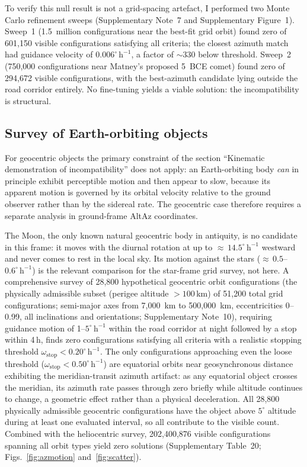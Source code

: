 \documentclass[sn-nature]{sn-jnl}
\begin{document}
To verify this null result is not a grid-spacing artefact, I performed two
Monte Carlo refinement sweeps (Supplementary Note~7
and Supplementary Figure~1). Sweep~1 (1.5~million configurations near the best-fit grid orbit)
found zero of 601,150 visible configurations satisfying all criteria; the
closest azimuth match had guidance velocity of $0.006^\circ\,\mathrm{h}^{-1}$, a
factor of ${\sim}330$ below threshold. Sweep~2 (750,000 configurations near
Matney's proposed 5~BCE comet) found zero of 294,672 visible configurations,
with the best-azimuth candidate lying outside the road corridor entirely. No
fine-tuning yields a viable solution: the incompatibility is structural.

\subsection{Survey of Earth-orbiting objects}\label{subsec:geocentric}

For geocentric objects the primary constraint of the section ``Kinematic demonstration of incompatibility''
does not apply: an Earth-orbiting body \emph{can} in principle exhibit
perceptible motion and then appear to slow, because its apparent motion is
governed by its orbital velocity relative to the ground observer rather than
by the sidereal rate. The geocentric case therefore requires a separate analysis
in ground-frame AltAz coordinates.

The Moon, the only known natural geocentric body in antiquity, is no
candidate in this frame: it moves with the diurnal rotation at up to
${\approx}\,14.5^\circ\,\mathrm{h}^{-1}$ westward and never comes to rest in
the local sky. Its motion against the stars (${\approx}\,0.5$--$0.6^\circ\,\mathrm{h}^{-1}$)
is the relevant comparison for the star-frame grid survey, not here.
A comprehensive survey of 28,800 hypothetical geocentric orbit configurations
(the physically admissible subset (perigee altitude $>100$\,km) of 51,200 total
grid configurations; semi-major axes from 7,000~km to 500,000~km,
eccentricities 0--0.99, all inclinations and orientations;
Supplementary Note~10), requiring guidance motion of
1--$5^\circ\,\mathrm{h}^{-1}$ within the road corridor at night followed by a stop
within 4\,h, finds zero configurations satisfying all criteria with a realistic
stopping threshold $\omega_\mathrm{stop} < 0.20^\circ\,\mathrm{h}^{-1}$.
The only configurations approaching even the loose threshold
($\omega_\mathrm{stop} < 0.50^\circ\,\mathrm{h}^{-1}$) are equatorial orbits
near geosynchronous distance exhibiting the meridian-transit azimuth artifact:
as any equatorial object crosses the meridian, its azimuth rate passes through
zero briefly while altitude continues to change, a geometric effect rather
than a physical deceleration.
All 28,800 physically admissible geocentric configurations have the object
above $5^\circ$ altitude during at least one evaluated interval, so all
contribute to the visible count.
Combined with the heliocentric survey, 202,400,876 visible configurations
spanning all orbit types yield zero solutions (Supplementary Table~20;
Figs.~\ref{fig:azmotion} and~\ref{fig:scatter}).
\end{document}
